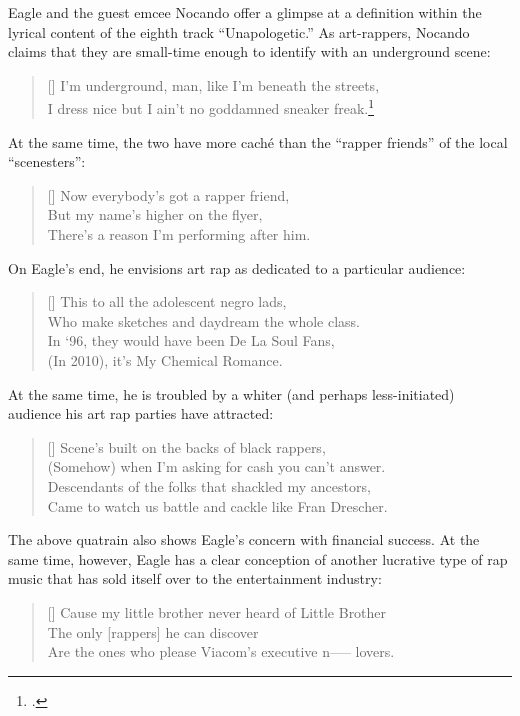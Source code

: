 Eagle and the guest emcee Nocando offer a glimpse at a definition within the lyrical content of
the eighth track ``Unapologetic.'' As art-rappers, Nocando claims that they are small-time enough
to identify with an underground scene:
\settowidth{\versewidth}{I dress nice but I ain't no goddamned sneaker freak.}
    \begin{verse}[\versewidth]
        \small I'm underground, man, like I'm beneath the streets, \\ 
        \small I dress nice but I ain't no goddamned sneaker freak.\footnote{
            \cite{openmikeeagle2010}.}
    \end{verse}
At the same time, the two have more caché than the ``rapper friends''  of the local  
``scenesters'':
\settowidth{\versewidth}{There's a reason I'm performing after him.}
    \begin{verse}[\versewidth]
        \small Now everybody's got a rapper friend, \\ 
        \small But my name's higher on the flyer,\\
        \small There's a reason I'm performing after him.
    \end{verse}
On Eagle's end, he envisions art rap as dedicated to a particular audience:
\settowidth{\versewidth}{Who make sketches and daydream the whole class.}
    \begin{verse}[\versewidth]
        \small This to all the adolescent negro lads, \\
        \small Who make sketches and daydream the whole class. \\
        \small In `96, they would have been De La Soul Fans, \\
        \small (In 2010), it's My Chemical Romance.
    \end{verse}
At the same time, he is troubled by a whiter (and perhaps less-initiated) audience his art rap 
parties have attracted:
\settowidth{\versewidth}{Came to watch us battle and cackle like Fran Drescher.}
    \begin{verse}[\versewidth]
        \small Scene's built on the backs of black rappers, \\
        \small (Somehow) when I'm asking for cash you can't answer. \\ 
        \small Descendants of the folks that shackled my ancestors, \\ 
        \small Came to watch us battle and cackle like Fran Drescher.
    \end{verse}
The above quatrain also shows Eagle's concern with financial success. At the same time, however, 
Eagle has a clear conception of another lucrative type of rap music that has sold itself over to 
the entertainment  industry:
\settowidth{\versewidth}{Cause my little brother never heard of Little Brother \textellipsis}
    \begin{verse}[\versewidth]
        \small Cause my little brother never heard of Little Brother \textellipsis \\ 
        \small The only [rappers] he can discover \\
        \small Are the ones who please Viacom's executive n----- lovers.
    \end{verse}

